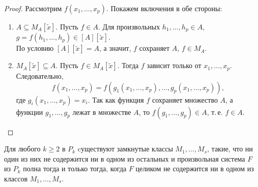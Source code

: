 \begin{proof}
    Рассмотрим $f(x_1, \ldots, x_p)$. Покажем включения в обе стороны:
    \begin{enumerate}
        \item $A\subseteq M_A[\widetilde{x}]$.
            Пусть $f \in A$. Для произвольных $h_1, \ldots, h_p \in A$, $g = f(h_1,\ldots, h_p) \in [A][\widetilde{x}]$.\\
            По условию $[A][\widetilde{x}] = A$, а значит, $f$ сохраняет $A$, $f \in M_A$.
        \item $M_A[\widetilde{x}] \subseteq A$. Пусть $f \in M_A[\widetilde{x}]$. Тогда $f$ зависит только от $x_1, \ldots, x_p$. Следовательно, 
        \[
            f(x_1, \ldots, x_p) = f(g_1(x_1, \ldots, x_p), \ldots, g_p(x_1, \ldots, x_p)),
        \]
        где $g_i(x_1, \ldots, x_p) = x_i$. Так как функция $f$ сохраняет множество $A$, а функции $g_1, \ldots, g_p$ лежат в множестве $A$, то $f(g_1, \ldots, g_p) \in A$, т.\,е. $f \in A$.
    \end{enumerate}
\end{proof}

\begin{theorem}[A.\,B.\,Кузнецов]
    Для любого $k \geqslant 2$ в $P_k$ cуществуют замкнутые классы $M_1, \ldots, M_s$, такие, что ни один из них не содержится ни в одном из остальных и произвольная система $F$ из $P_k$ полна тогда и только тогда, когда $F$ целиком не содержится ни в одном из классов $M_1, \ldots, M_s$.
\end{theorem}

